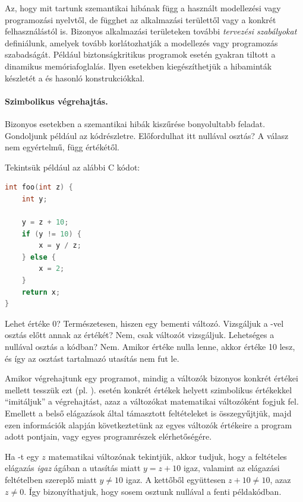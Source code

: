 Az, hogy mit tartunk szemantikai hibának függ a használt modellezési vagy programozási nyelvtől, de függhet az alkalmazási területtől vagy a konkrét felhasználástól is. Bizonyos alkalmazási területeken további \emph{tervezési szabályokat} definiálunk, amelyek tovább korlátozhatják a modellezés vagy programozás szabadságát. Például biztonságkritikus programok esetén gyakran tiltott a dinamikus memóriafoglalás. Ilyen esetekben kiegészíthetjük a hibaminták készletét a  és hasonló konstrukciókkal.

\paragraph{Szimbolikus végrehajtás.}
Bizonyos esetekben a szemantikai hibák kiszűrése bonyolultabb feladat. Gondoljunk például az  kódrészletre. Előfordulhat itt nullával osztás? A válasz nem egyértelmű, függ  értékétől.

\begin{pelda}
Tekintsük például az alábbi C kódot:
\begin{lstlisting}[language=C]
int foo(int z) {
    int y;
	
    y = z + 10;
    if (y != 10) {
        x = y / z;
    } else {
        x = 2;
    }
    return x;
}
\end{lstlisting}

Lehet  értéke 0? Természetesen, hiszen  egy bementi változó. Vizsgáljuk a -vel osztás előtt annak az értékét? Nem, csak  változót vizsgáljuk. Lehetséges a nullával osztás a kódban? Nem. Amikor  értéke nulla lenne, akkor  értéke 10 lesz, és így az osztást tartalmazó utasítás nem fut le.
\end{pelda}

Amikor végrehajtunk egy programot, mindig a változók bizonyos konkrét értékei mellett tesszük ezt (pl. ).  esetén konkrét értékek helyett szimbolikus értékekkel ``imitáljuk'' a végrehajtást, azaz a változókat matematikai változóként fogjuk fel. Emellett a belső elágazások által támasztott feltételeket is összegyűjtjük, majd ezen információk alapján következtetünk az egyes változók értékeire a program adott pontjain, vagy egyes programrészek elérhetőségére.

\begin{pelda}
Ha -t egy $z$ matematikai változónak tekintjük, akkor tudjuk, hogy a feltételes elágazás \emph{igaz} ágában a  utasítás miatt $y = z + 10$ igaz, valamint az elágazási feltételben szereplő  miatt $y \neq 10$ igaz. A kettőből együttesen $z + 10 \neq 10$, azaz $z \neq 0$. Így bizonyíthatjuk, hogy sosem osztunk nullával a fenti példakódban.
\end{pelda}

